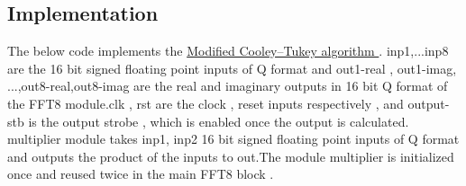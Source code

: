 \documentclass{article}
\begin{document}
\subsection{Implementation}

The below code implements the \hyperref[modified_Cooley_Tukey_algorithm]{Modified Cooley–Tukey algorithm }. inp1,...inp8 are the 16 bit signed floating point inputs of Q format and out1-real , out1-imag, ...,out8-real,out8-imag are the real and imaginary outputs in 16 bit Q format of the FFT8 module.clk , rst are the clock , reset inputs respectively , and output-stb is the output strobe , which is enabled once the output is calculated.
multiplier module takes inp1, inp2 16 bit signed floating point inputs of Q format and outputs the product of the inputs to out.The module multiplier is initialized once and reused twice in the main FFT8 block .
\end{document}
